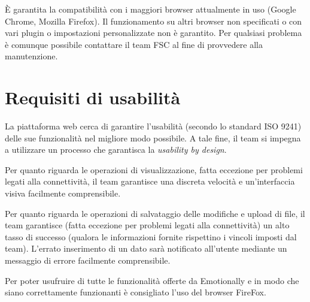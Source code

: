 È garantita la compatibilità con i maggiori browser attualmente in uso (Google 
Chrome, Mozilla Firefox). Il funzionamento su altri browser non specificati o 
con vari plugin o impostazioni personalizzate non è garantito. Per qualsiasi 
problema è comunque possibile contattare il team FSC al fine di provvedere alla 
manutenzione.

\section{Requisiti di usabilità}\label{sec:requisiti-di-usabilita}
La piattaforma web cerca di garantire l'usabilità (secondo lo standard ISO 
9241) delle sue funzionalità nel migliore modo possibile. A tale fine, il team 
si impegna a utilizzare un processo che garantisca la \textit{usability by 
design}.

Per quanto riguarda le operazioni di visualizzazione, fatta eccezione per 
problemi legati alla connettività, il team garantisce una discreta velocità e 
un'interfaccia visiva facilmente comprensibile.

Per quanto riguarda le operazioni di salvataggio delle modifiche e upload di 
file, il team garantisce (fatta eccezione per problemi legati alla 
connettività) un alto tasso di successo (qualora le informazioni fornite 
rispettino i vincoli imposti dal team). L'errato inserimento di un dato sarà 
notificato all'utente mediante un messaggio di errore facilmente comprensibile.

Per poter usufruire di tutte le funzionalità offerte da Emotionally e in modo 
che siano correttamente funzionanti è consigliato l'uso del browser FireFox.